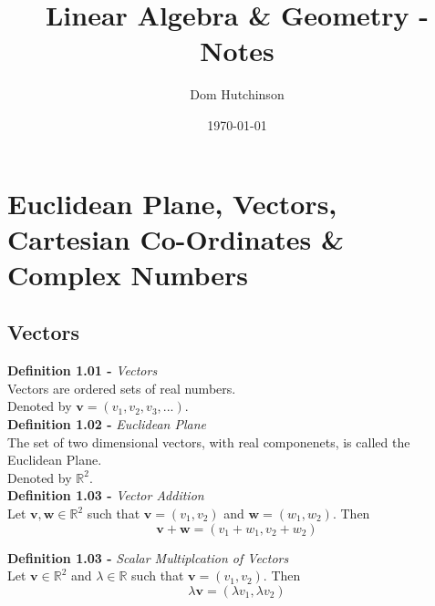 \documentclass[11pt,a4paper]{article}
\begin{document}
\pagestyle{fancy}
\setlength\parindent{0pt}
\allowdisplaybreaks

\renewcommand{\headrulewidth}{0pt}
\newcommand{\vect}[1]{\boldsymbol{#1}}
\newcommand{\subtitle}[2]{\textbf{#1}\textit{#2} \\}
\newcommand{\dotprod}[0]{\boldsymbol{\cdot}}
\newcommand{\real}[0]{\mathbb{R}}
\newcommand{\nat}[0]{\mathbb{N}}
\newcommand{\field}[0]{\mathbb{F}}
\newcommand{\vectorspace}[0]{\mathbb{V}}
\newcommand{\basis}[0]{\mathbb{B}}
\newcommand{\complex}[0]{\mathbb{C}}
\newcommand{\innerproduct}[1]{\langle #1 \rangle}

\title{Linear Algebra \& Geometry - Notes}
\author{Dom Hutchinson}
\date{\today}
\maketitle

\fancyhead[R]{\today}

\tableofcontents

\newpage

\section{Euclidean Plane, Vectors, Cartesian Co-Ordinates \& Complex Numbers}

\subsection{Vectors}

\subtitle{Definition 1.01 - }{Vectors}
Vectors are ordered sets of real numbers.\\
Denoted by $\vect{v} = (v_1, v_2, v_3,...)$.\\

\subtitle{Definition 1.02 - }{Euclidean Plane}
The set of two dimensional vectors, with real componenets, is called the Euclidean Plane. \\
Denoted by $\real^2$.\\

\subtitle{Definition 1.03 - }{Vector Addition}
Let $\vect{v}, \vect{w} \in \real^2$ such that $\vect{v} = (v_1,v_2)$ and $\vect{w} = (w_1,w_2)$. Then\\
$$\vect{v} + \vect{w} = (v_1 + w_1, v_2 + w_2)$$

\subtitle{Definition 1.03 - }{Scalar Multiplcation of Vectors}
Let $\vect{v} \in \real^2$ and $\lambda \in \real$ such that $\vect{v} = (v_1,v_2)$. Then\\
$$\lambda\vect{v} = (\lambda v_1, \lambda v_2)$$
\end{document}
